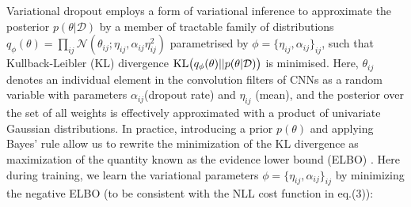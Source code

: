 Variational dropout \cite{kingma2015variational} employs a form of variational inference to approximate the posterior $p(\theta|\mathcal{D})$ by a member of tractable family of distributions $q_{\phi}(\theta) = \prod_{ij} \mathcal{N}(\theta_{ij}; \eta_{ij}, \alpha_{ij}\eta_{ij}^2)$ parametrised by $\phi=\{\eta_{ij}, \alpha_{ij}\}_{ij}$, such that Kullback-Leibler (KL) divergence $\text{KL} \big{(}q_{\phi}(\theta)||p(\theta|\mathcal{D})\big{)}$ is minimised. Here, $\theta_{ij}$ denotes an individual element in the convolution filters of CNNs as a random variable with parameters $\alpha_{ij}$(dropout rate) and $\eta_{ij}$ (mean), and the posterior over the set of all weights is effectively approximated with a product of univariate Gaussian distributions. In practice, introducing a prior $p(\theta)$ and applying Bayes' rule allow us to rewrite the minimization of the KL divergence as maximization of the quantity known as the evidence lower bound (ELBO) \cite{blei2017variational}. Here during training, we learn the variational parameters $\phi=\{\eta_{ij}, \alpha_{ij}\}_{ij}$ by minimizing the negative ELBO (to be consistent with the NLL cost function in eq.(3)): 
 
